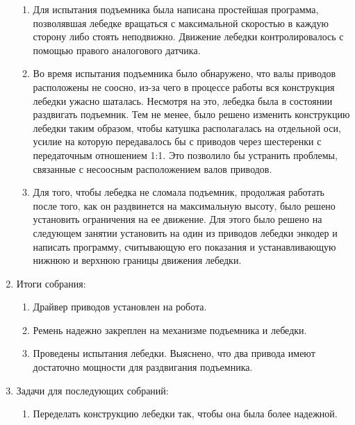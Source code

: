 \begin{enumerate}
\begin{enumerate}
      \item	Для испытания подъемника была написана простейшая программа, позволявшая лебедке вращаться с максимальной скоростью в каждую сторону либо стоять неподвижно. Движение лебедки контролировалось с помощью правого аналогового датчика.\newline
      
      \item	Во время испытания подъемника было обнаружено, что валы приводов расположены не соосно, из-за чего в процессе работы вся конструкция лебедки ужасно шаталась. Несмотря на это, лебедка была в состоянии раздвигать подъемник. Тем не менее, было решено изменить конструкцию лебедки таким образом, чтобы катушка располагалась на отдельной оси, усилие на которую передавалось бы с приводов через шестеренки с передаточным отношением 1:1. Это позволило бы устранить проблемы, связанные с несоосным расположением валов приводов.\newline
      
      \item	Для того, чтобы лебедка не сломала подъемник, продолжая работать после того, как он раздвинется на максимальную высоту, было решено установить ограничения на ее движение. Для этого было решено на следующем занятии установить на один из приводов лебедки энкодер и написать программу, считывающую его показания и устанавливающую нижнюю и верхнюю границы движения лебедки.\newline
      
    \end{enumerate}
    
	\item Итоги собрания: \newline
	\begin{enumerate}
	  \item	Драйвер приводов установлен на робота.\newline
	  
	  \item	Ремень надежно закреплен на механизме подъемника и лебедки.\newline
	  
	  \item	Проведены испытания лебедки. Выяснено, что два привода имеют достаточно мощности для раздвигания подъемника.\newline
	  
    \end{enumerate}
    
	\item Задачи для последующих собраний:\newline
	\begin{enumerate}
	  \item	Переделать конструкцию лебедки так, чтобы она была более надежной.\newline
	  

\end{enumerate}
\end{enumerate}
